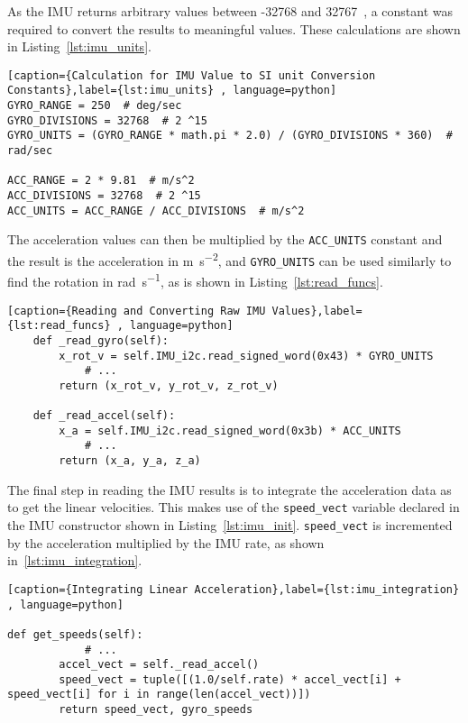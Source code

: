 As the IMU returns arbitrary values between -32768 and 32767~\cite{MPU6050Datasheet},
a constant was required to convert the results to meaningful values. These calculations are shown in Listing~\ref{lst:imu_units}.

\begin{lstlisting}[caption={Calculation for IMU Value to SI unit Conversion Constants},label={lst:imu_units} , language=python]
GYRO_RANGE = 250  # deg/sec
GYRO_DIVISIONS = 32768  # 2 ^15
GYRO_UNITS = (GYRO_RANGE * math.pi * 2.0) / (GYRO_DIVISIONS * 360)  # rad/sec

ACC_RANGE = 2 * 9.81  # m/s^2
ACC_DIVISIONS = 32768  # 2 ^15
ACC_UNITS = ACC_RANGE / ACC_DIVISIONS  # m/s^2
\end{lstlisting}

The acceleration values can then be multiplied by the \verb|ACC_UNITS|
constant and the result is the acceleration in \si{\metre\per\second\squared}, and \verb|GYRO_UNITS|
can be used similarly to find the rotation in \si{\radian\per\second}, as is
shown in Listing~\ref{lst:read_funcs}.


\begin{lstlisting}[caption={Reading and Converting Raw IMU Values},label={lst:read_funcs} , language=python]
    def _read_gyro(self):
        x_rot_v = self.IMU_i2c.read_signed_word(0x43) * GYRO_UNITS
		    # ...
        return (x_rot_v, y_rot_v, z_rot_v)

    def _read_accel(self):
        x_a = self.IMU_i2c.read_signed_word(0x3b) * ACC_UNITS
		    # ...
        return (x_a, y_a, z_a)
\end{lstlisting}

The final step in reading the IMU results is to integrate the acceleration
data as to get the linear velocities. This makes use of the \verb|speed_vect| variable declared in the IMU constructor shown in Listing~\ref{lst:imu_init}. \verb|speed_vect| is incremented by the
acceleration multiplied by the IMU rate, as shown in~\ref{lst:imu_integration}.

\begin{lstlisting}[caption={Integrating Linear Acceleration},label={lst:imu_integration} , language=python]

def get_speeds(self):
		    # ...
        accel_vect = self._read_accel()
        speed_vect = tuple([(1.0/self.rate) * accel_vect[i] + speed_vect[i] for i in range(len(accel_vect))])
        return speed_vect, gyro_speeds
\end{lstlisting}


